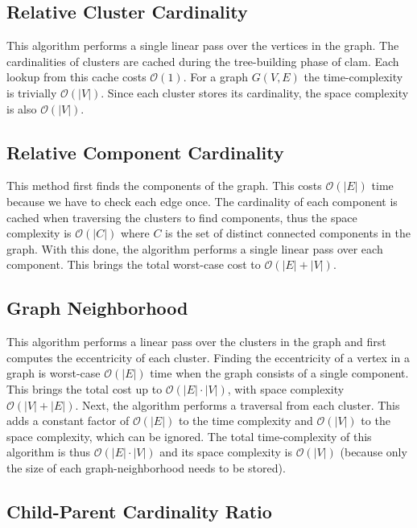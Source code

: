 \documentclass{article}
\begin{document}
\subsection{Relative Cluster Cardinality}

This algorithm performs a single linear pass over the vertices in the graph.
The cardinalities of clusters are cached during the tree-building phase of clam.
Each lookup from this cache costs $\mathcal{O}(1)$.
For a graph $G(V, E)$ the time-complexity is trivially $\mathcal{O}(|V|)$.
Since each cluster stores its cardinality, the space complexity is also $\mathcal{O}(|V|)$.

\subsection{Relative Component Cardinality}

This method first finds the components of the graph.
This costs $\mathcal{O}(|E|)$ time because we have to check each edge once.
The cardinality of each component is cached when traversing the clusters to find components, thus the space complexity is $\mathcal{O}(|C|)$ where $C$ is the set of distinct connected components in the graph.
With this done, the algorithm performs a single linear pass over each component.
This brings the total worst-case cost to $\mathcal{O}(|E| + |V|)$.

\subsection{Graph Neighborhood}

This algorithm performs a linear pass over the clusters in the graph and first computes the eccentricity of each cluster.
Finding the eccentricity of a vertex in a graph is worst-case $\mathcal{O}(|E|)$ time when the graph consists of a single component.
This brings the total cost up to $\mathcal{O}(|E| \cdot |V|)$, with space complexity $\mathcal{O}(|V|+|E|)$.
Next, the algorithm performs a traversal from each cluster.
This adds a constant factor of $\mathcal{O}(|E|)$ to the time complexity and $\mathcal{O}(|V|)$ to the space complexity, which can be ignored.
The total time-complexity of this algorithm is thus $\mathcal{O}(|E| \cdot |V|)$ and its space complexity is $\mathcal{O}(|V|)$ (because only the size of each graph-neighborhood needs to be stored).

\subsection{Child-Parent Cardinality Ratio}
\end{document}
